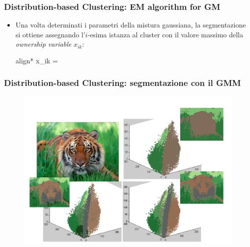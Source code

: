 \begin{frame}

	\frametitle{{\color{GradientDescentDiagramOrange}Distribution-based Clustering}: EM algorithm for GM}

		\begin{itemize}
			\item Una volta determinati i parametri della mistura gaussiana, la segmentazione si ottiene assegnando l'$i$-esima istanza al cluster con il valore massimo della \textit{ownership variable} $x_{ik}$:
			\begin{empheq}[box=\fcolorbox{blue!40!black!60}{yellow!10}]{align*}
				x_{ik} = 
			\end{empheq}
		\end{itemize}

\end{frame}


\begin{frame}

	\frametitle{{\color{GradientDescentDiagramOrange}Distribution-based Clustering}: segmentazione con il GMM}

		\begin{figure}[!htbp]
				\centering
				\includegraphics[angle=0,width=0.85\linewidth]{images/unsupervised/gaussian_mixture/gmm_lion.pdf}
			\end{figure}

\end{frame}


